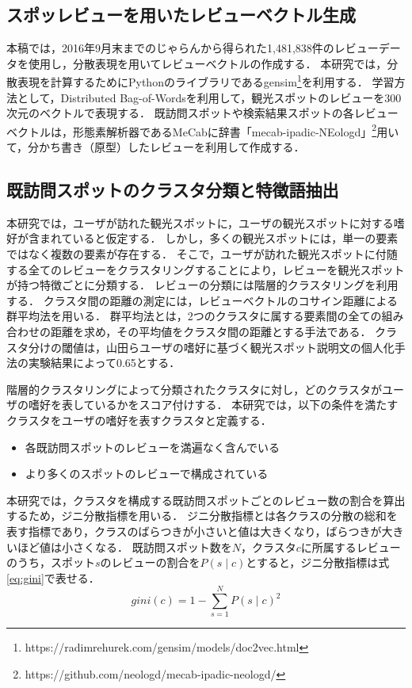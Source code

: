 \documentclass{deimj}
\begin{document}
\subsection{スポッレビューを用いたレビューベクトル生成}
本稿では，2016年9月末までのじゃらんから得られた1,481,838件のレビューデータを使用し，分散表現\cite{doc2vec}を用いてレビューベクトルの作成する．
本研究では，分散表現を計算するためにPythonのライブラリであるgensim\footnote{https://radimrehurek.com/gensim/models/doc2vec.html}を利用する．
学習方法として，Distributed Bag-of-Wordsを利用して，観光スポットのレビューを300次元のベクトルで表現する．
既訪問スポットや検索結果スポットの各レビューベクトルは，形態素解析器であるMeCab\cite{mecab}に辞書「mecab-ipadic-NEologd」\footnote{https://github.com/neologd/mecab-ipadic-neologd/}用いて，分かち書き（原型）したレビューを利用して作成する．
\subsection{既訪問スポットのクラスタ分類と特徴語抽出}
\label{sub:既訪問スポットのクラスタ分類と特徴語抽出}
本研究では，ユーザが訪れた観光スポットに，ユーザの観光スポットに対する嗜好が含まれていると仮定する．
しかし，多くの観光スポットには，単一の要素ではなく複数の要素が存在する．
そこで，ユーザが訪れた観光スポットに付随する全てのレビューをクラスタリングすることにより，レビューを観光スポットが持つ特徴ごとに分類する．
レビューの分類には階層的クラスタリングを利用する．
クラスタ間の距離の測定には，レビューベクトルのコサイン距離による群平均法を用いる．
群平均法とは，2つのクラスタに属する要素間の全ての組み合わせの距離を求め，その平均値をクラスタ間の距離とする手法である．
クラスタ分けの閾値は，山田ら\cite{山田}ユーザの嗜好に基づく観光スポット説明文の個人化手法の実験結果によって0.65とする．

階層的クラスタリングによって分類されたクラスタに対し，どのクラスタがユーザの嗜好を表しているかをスコア付けする．
本研究では，以下の条件を満たすクラスタをユーザの嗜好を表すクラスタと定義する．
\begin{itemize}
 \item 各既訪問スポットのレビューを満遍なく含んでいる
 \item より多くのスポットのレビューで構成されている
\end{itemize}

本研究では，クラスタを構成する既訪問スポットごとのレビュー数の割合を算出するため，ジニ分散指標を用いる．
ジニ分散指標とは各クラスの分散の総和を表す指標であり，クラスのばらつきが小さいと値は大きくなり，ばらつきが大きいほど値は小さくなる．
既訪問スポット数を$N$，クラスタ$c$に所属するレビューのうち，スポット$s$のレビューの割合を$P(s \mid c)$とすると，ジニ分散指標は式\ref{eq:gini}で表せる．
\begin{equation}
    gini(c)=1-\sum ^{N}_{s=1} P(s \mid c) ^{2}
    \label{eq:gini}
\end{equation}
\end{document}
